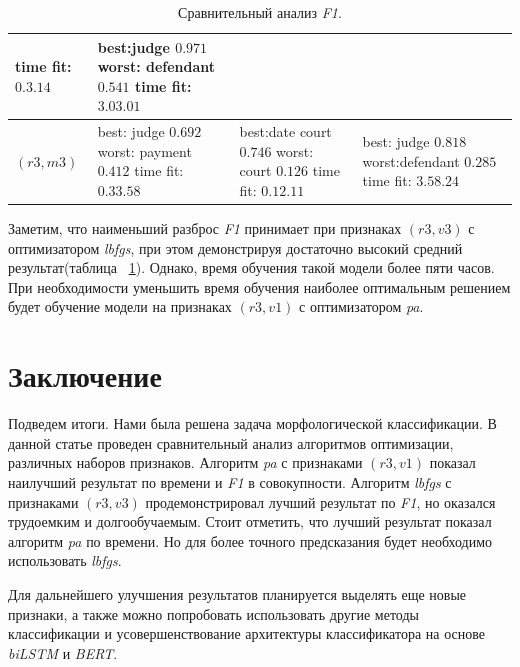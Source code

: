 \documentclass{csmathnotes}
\begin{document}
\begin{table}[!h]
\begin{center}
\begin{tabular}{|p{2.1cm}|p{2.5cm}|p{2.5cm}|p{2.5cm}|}
              time fit:\newline $0.3.14$
            & best:\newline  judge $0.971$\newline
              worst: \newline defendant  $0.541$\newline
              time fit:\newline $3.03.01$\\
            \hline
            $(r3, m3)$
            & best: \newline judge $0.692$ \newline
            worst: \newline payment $0.412$ \newline
            time fit: \newline  $0.33.58$
            & best:\newline   date court   $0.746$ \newline
             worst: \newline court $0.126$ \newline
             time fit: \newline $0.12.11$
            & best: \newline   judge $0.818$ \newline
              worst:\newline defendant $0.285$ \newline 
              time fit: \newline $3.58.24$\\
            \hline
        \end{tabular}
    \end{center}
    \caption{\label{tabl:table2}Сравнительный анализ \emph{F1}.}
\end{table}

Заметим, что наименьший разброс \emph{F1}  принимает при признаках $(r3,v3)$ с оптимизатором \emph{lbfgs}, при этом демонстрируя достаточно высокий средний результат(таблица ~\ref{tabl:table2}). Однако, время обучения такой модели более пяти часов. При необходимости уменьшить время обучения наиболее оптимальным решением будет обучение модели на признаках $(r3,v1)$ с оптимизатором \emph{pa}.

\section*{Заключение}
Подведем итоги. Нами была решена задача морфологической классификации. В данной статье проведен сравнительный анализ алгоритмов оптимизации, различных наборов признаков. Алгоритм \emph{pa} с признаками $(r3, v1)$ показал наилучший результат по времени и \emph{F1}  в совокупности. Алгоритм \emph{lbfgs}  с признаками $(r3, v3)$ продемонстрировал лучший результат по \emph{F1}, но оказался трудоемким и долгообучаемым. Стоит отметить, что лучший результат показал алгоритм \emph{pa} по времени. Но для более точного предсказания будет необходимо использовать \emph{lbfgs}.


Для дальнейшего улучшения результатов планируется выделять еще новые признаки, а также можно попробовать использовать другие методы классификации и усовершенствование архитектуры классификатора на основе \emph{biLSTM} и \emph{BERT}.

\printbibliography
\end{document}
